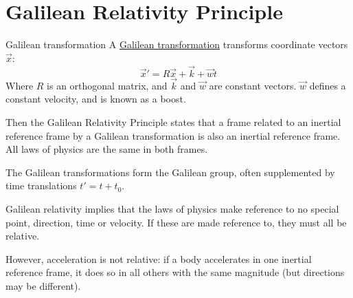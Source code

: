 \documentclass[../Main.tex]{subfiles}
\begin{document}
\section{Galilean Relativity Principle}
\begin{definition}{Galilean transformation}
    A \underline{Galilean transformation} transforms coordinate vectors $\vec{x}$:
    \begin{equation}
        \vec{x}' = R\vec{x} + \vec{k} + \vec{w}t
        \label{eqnGalileanTransform}
    \end{equation}
    Where $R$ is an orthogonal matrix, and $\vec{k}$ and $\vec{w}$ are constant vectors. $\vec{w}$ defines a constant velocity, and is known as a boost.
\end{definition}
Then the Galilean Relativity Principle states that a frame related to an inertial reference frame by a Galilean transformation is also an inertial reference frame. All laws of physics are the same in both frames.\par
The Galilean transformations form the Galilean group, often supplemented by time translations $t' = t + t_0$.\par
Galilean relativity implies that the laws of physics make reference to no special point, direction, time or velocity. If these are made reference to, they must all be relative.\par
However, acceleration is not relative: if a body accelerates in one inertial reference frame, it does so in all others with the same magnitude (but directions may be different).
\end{document}
